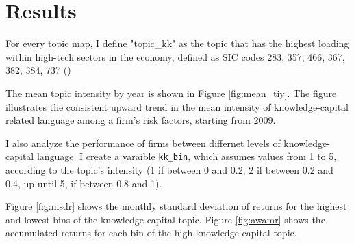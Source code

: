 \documentclass[12pt, letterpaper]{article}
\begin{document}




\section{Results}

For every topic map, I define "topic\_kk" as the topic that has the highest loading within high-tech sectors in the economy, defined as SIC codes 283, 357, 466, 367, 382, 384, 737 (\cite{Brown2009-zp}) 



  

The mean topic intensity by year is shown in Figure \ref{fig:mean_tiy}. The figure illustrates the consistent upward trend in the mean intensity of knowledge-capital related language among a firm's risk factors, starting from 2009. 


I also analyze the performance of firms between differnet levels of knowledge-capital language. I create a varaible \texttt{kk\_bin}, which assumes values from 1 to 5, according to the topic's intensity (1 if between 0 and 0.2, 2 if between 0.2 and 0.4, up until 5, if between 0.8 and 1).

Figure \ref{fig:msdr} shows the monthly standard deviation of returns for the highest and lowest bins of the knowledge capital topic. Figure \ref{fig:awamr} shows the accumulated returns for each bin of the high knowledge capital topic.
 


\end{document}
